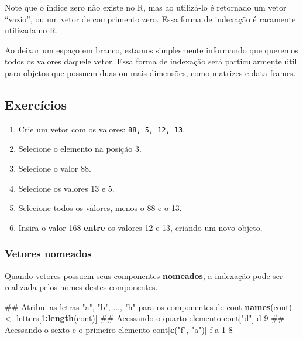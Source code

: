 \documentclass[10pt,a4paper]{book}
\newenvironment{Shaded}{\begin{snugshade}}{\end{snugshade}}
\newcommand{\KeywordTok}[1]{\textcolor[rgb]{0.13,0.29,0.53}{\textbf{#1}}}
\newcommand{\DecValTok}[1]{\textcolor[rgb]{0.00,0.00,0.81}{#1}}
\newcommand{\StringTok}[1]{\textcolor[rgb]{0.31,0.60,0.02}{#1}}
\newcommand{\OperatorTok}[1]{\textcolor[rgb]{0.81,0.36,0.00}{\textbf{#1}}}
\newcommand{\NormalTok}[1]{#1}
\providecommand{\tightlist}{%
  \setlength{\itemsep}{0pt}\setlength{\parskip}{0pt}}
\begin{document}
Note que o índice zero não existe no R, mas ao utilizá-lo é retornado um
vetor ``vazio'', ou um vetor de comprimento zero. Essa forma de
indexação é raramente utilizada no R.

Ao deixar um espaço em branco, estamos simplesmente informando que
queremos todos os valores daquele vetor. Essa forma de indexação será
particularmente útil para objetos que possuem duas ou mais dimensões,
como matrizes e data frames.

\subsection*{Exercícios}\label{exercuxedcios-5}


\begin{enumerate}
\def\labelenumi{\arabic{enumi}.}
\tightlist
\item
  Crie um vetor com os valores: \texttt{88,\ 5,\ 12,\ 13}.
\item
  Selecione o elemento na posição 3.
\item
  Selecione o valor 88.
\item
  Selecione os valores 13 e 5.
\item
  Selecione todos os valores, menos o 88 e o 13.
\item
  Insira o valor 168 \textbf{entre} os valores 12 e 13, criando um novo
  objeto.
\end{enumerate}

\subsubsection{Vetores nomeados}\label{vetores-nomeados}

Quando vetores possuem seus componentes \textbf{nomeados}, a indexação
pode ser realizada pelos nomes destes componentes.

\begin{Shaded}
\begin{Highlighting}[]
\NormalTok{## Atribui as letras "a", "b", ..., "h" para os componentes de cont}
\KeywordTok{names}\NormalTok{(cont) <-}\StringTok{ }\NormalTok{letters[}\DecValTok{1}\OperatorTok{:}\KeywordTok{length}\NormalTok{(cont)]}
\NormalTok{## Acessando o quarto elemento}
\NormalTok{cont[}\StringTok{"d"}\NormalTok{]}
\NormalTok{d }
\DecValTok{9} 
\NormalTok{## Acessando o sexto e o primeiro elemento}
\NormalTok{cont[}\KeywordTok{c}\NormalTok{(}\StringTok{"f"}\NormalTok{, }\StringTok{"a"}\NormalTok{)]}
\NormalTok{f a }
\DecValTok{1} \DecValTok{8} 
\end{Highlighting}
\end{Shaded}
\end{document}
